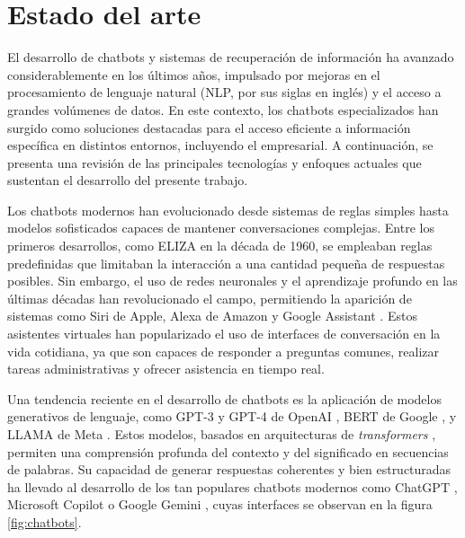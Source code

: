 \vspace{15mm}

\section{Estado del arte}

El desarrollo de chatbots y sistemas de recuperación de información ha avanzado considerablemente en los últimos años, 
impulsado por mejoras en el procesamiento de lenguaje natural (NLP, por sus siglas en inglés) y el acceso a grandes volúmenes de datos. 
En este contexto, los chatbots especializados han surgido como soluciones destacadas para el acceso eficiente 
a información específica en distintos entornos, incluyendo el empresarial. A continuación, se presenta una revisión 
de las principales tecnologías y enfoques actuales que sustentan el desarrollo del presente trabajo.

Los chatbots modernos han evolucionado desde sistemas de reglas simples hasta modelos sofisticados capaces de 
mantener conversaciones complejas. Entre los primeros desarrollos, como ELIZA \citep{paper:eliza} en 
la década de 1960, se empleaban reglas predefinidas que limitaban la interacción a una cantidad pequeña de 
respuestas posibles. Sin embargo, el uso de redes neuronales y el aprendizaje profundo en las últimas décadas 
han revolucionado el campo, permitiendo la aparición de sistemas como Siri de Apple, Alexa de Amazon 
y Google Assistant \citep{article:voice-assistants}. Estos asistentes virtuales han popularizado el uso de interfaces 
de conversación en la vida cotidiana, ya que son capaces de responder a preguntas comunes, realizar tareas administrativas 
y ofrecer asistencia en tiempo real.

Una tendencia reciente en el desarrollo de chatbots es la aplicación de modelos generativos de lenguaje, como GPT-3 y GPT-4 
de OpenAI \citep{paper:gpt}, BERT de Google \citep{paper:bert}, y LLAMA de Meta \citep{paper:llama}. Estos modelos, basados 
en arquitecturas de \textit{transformers} \citep{paper:transformers}, permiten una comprensión profunda del contexto y del 
significado en secuencias de palabras. Su capacidad de generar respuestas coherentes y bien estructuradas ha llevado al 
desarrollo de los tan populares chatbots modernos como ChatGPT \citep{website:chatgpt}, Microsoft Copilot \citep{website:copilot}
o Google Gemini \citep{website:gemini}, cuyas interfaces se observan en la figura \ref{fig:chatbots}.

